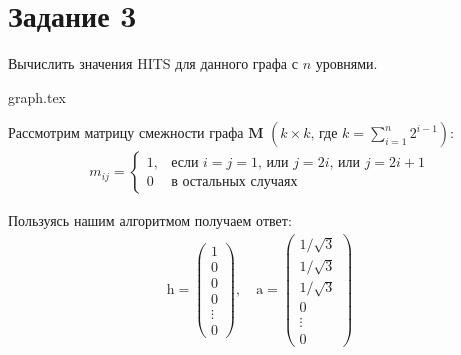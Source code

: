 \documentclass[class=article,crop=false]{standalone}
\begin{document}
    \section*{Задание 3}
    Вычислить значения HITS для данного графа с $n$ уровнями.

    \begin{figure*}[h]
        \centering
        {graph.tex}
    \end{figure*}

    \noindent Рассмотрим матрицу смежности графа $\mathbf{M}$ $\left( k\times k\text{, где }k=\sum\limits_{i=1}^n 2^{i-1}  \right)$:
    \begin{gather*}
        m_{ij}=
        \begin{cases}
            1,&\text{если $i=j=1$, или $j=2i$, или $j=2i+1$}\\
            0&\text{в остальных случаях}
        \end{cases}
    \end{gather*}

    \noindent Пользуясь нашим алгоритмом получаем ответ:
    \begin{gather*}
        \mathrm{h}=
        \begin{pmatrix}
            1      \\
            0      \\
            0      \\
            0      \\
            \vdots \\
            0
        \end{pmatrix},\quad
        \mathrm{a}=
        \begin{pmatrix}
            1/\sqrt{3} \\
            1/\sqrt{3} \\
            1/\sqrt{3} \\
            0          \\
            \vdots     \\
            0
        \end{pmatrix}
    \end{gather*}
\end{document}
